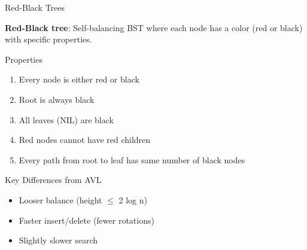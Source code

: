 \documentclass[aspectratio=169,xcolor=dvipsnames]{beamer}
\begin{document}
\begin{frame}{Red-Black Trees}
  \begin{definition}
    \textbf{Red-Black tree}: Self-balancing BST where each node has a color (red or black) with specific properties.
  \end{definition}

  \begin{block}{Properties}
    \begin{enumerate}
      \item Every node is either red or black
      \item Root is always black
      \item All leaves (NIL) are black
      \item Red nodes cannot have red children
      \item Every path from root to leaf has same number of black nodes
    \end{enumerate}
  \end{block}

  \vspace{0.3cm}

  \begin{alertblock}{Key Differences from AVL}
    \begin{itemize}
      \item Looser balance (height $\leq$ 2 log n)
      \item Faster insert/delete (fewer rotations)
      \item Slightly slower search
    \end{itemize}
  \end{alertblock}
\end{frame}
\end{document}
